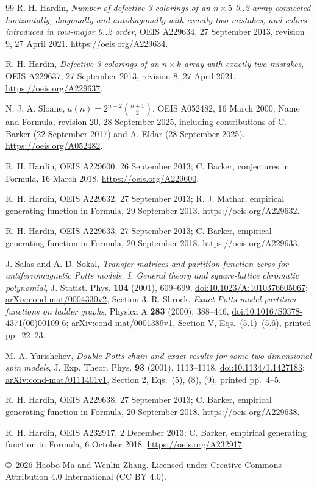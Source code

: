 \documentclass[11pt]{article}
\begin{document}
\begin{thebibliography}{99}
R. H. Hardin, \emph{Number of defective 3-colorings of an $n\times5$
0..2 array connected horizontally, diagonally and antidiagonally with
exactly two mistakes, and colors introduced in row-major 0..2 order},
OEIS A229634, 27 September 2013, revision 9, 27 April 2021.
\url{https://oeis.org/A229634}.

R. H. Hardin, \emph{Defective 3-colorings of an $n\times k$ array
with exactly two mistakes}, OEIS A229637, 27 September 2013,
revision 8, 27 April 2021. \url{https://oeis.org/A229637}.

N. J. A. Sloane, \emph{$a(n)=2^{n-2}\binom{n+1}{2}$},
OEIS A052482, 16 March 2000; Name and Formula, revision 20,
28 September 2025, including contributions of C. Barker
(22 September 2017) and A. Eldar (28 September 2025).
\url{https://oeis.org/A052482}.

R. H. Hardin, OEIS A229600, 26 September 2013;
C. Barker, conjectures in Formula, 16 March 2018.
\url{https://oeis.org/A229600}.

R. H. Hardin, OEIS A229632, 27 September 2013;
R. J. Mathar, empirical generating function in Formula, 29 September 2013.
\url{https://oeis.org/A229632}.

R. H. Hardin, OEIS A229633, 27 September 2013;
C. Barker, empirical generating function in Formula, 20 September 2018.
\url{https://oeis.org/A229633}.

J. Salas and A. D. Sokal, \emph{Transfer matrices and partition-function zeros
for antiferromagnetic Potts models. I. General theory and square-lattice
chromatic polynomial}, J. Statist. Phys. \textbf{104} (2001), 609--699,
\href{https://doi.org/10.1023/A:1010376605067}{doi:10.1023/A:1010376605067};
\href{https://arxiv.org/abs/cond-mat/0004330v2}{arXiv:cond-mat/0004330v2}, Section 3.
R. Shrock, \emph{Exact Potts model partition functions on ladder graphs},
Physica A \textbf{283} (2000), 388--446,
\href{https://doi.org/10.1016/S0378-4371(00)00109-6}{doi:10.1016/S0378-4371(00)00109-6};
\href{https://arxiv.org/abs/cond-mat/0001389v1}{arXiv:cond-mat/0001389v1},
Section V, Eqs.~(5.1)--(5.6), printed pp.~22--23.

M. A. Yurishchev, \emph{Double Potts chain and exact results for some
two-dimensional spin models}, J. Exp. Theor. Phys. \textbf{93} (2001),
1113--1118, \href{https://doi.org/10.1134/1.1427183}{doi:10.1134/1.1427183};
\href{https://arxiv.org/abs/cond-mat/0111401v1}{arXiv:cond-mat/0111401v1},
Section 2, Eqs.~(5), (8), (9), printed pp.~4--5.

R. H. Hardin, OEIS A229638, 27 September 2013;
C. Barker, empirical generating function in Formula, 20 September 2018.
\url{https://oeis.org/A229638}.

R. H. Hardin, OEIS A232917, 2 December 2013;
C. Barker, empirical generating function in Formula, 6 October 2018.
\url{https://oeis.org/A232917}.
\end{thebibliography}
\noindent\small\copyright\ 2026 Haobo Ma and Wenlin Zhang.
Licensed under Creative Commons Attribution 4.0 International
(CC BY 4.0).
\end{document}
